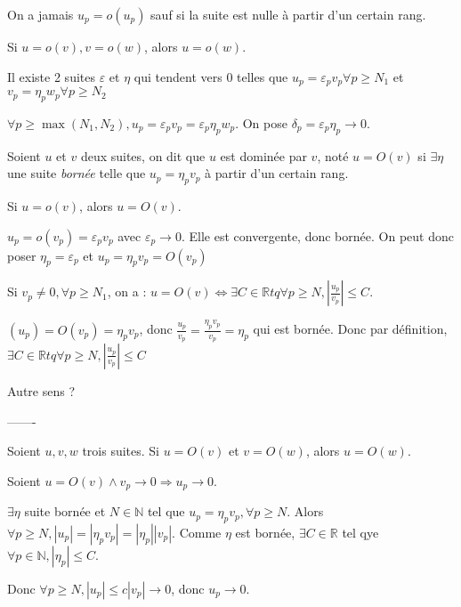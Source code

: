 \documentclass[french]{yLectureNote}
\newcommand{\N}[0]{\mathbb{N}}
\newcommand{\R}[0]{\mathbb{R}}
\begin{document}
On a jamais $u_p = o(u_p)$ sauf si la suite est nulle à partir d'un certain rang.
\begin{proposition}
Si $u = o(v), v=o(w)$, alors $u=o(w)$.
\end{proposition}
\begin{myproof}
Il existe 2 suites $\varepsilon$ et $\eta$ qui tendent vers 0 telles que $u_p = \varepsilon_pv_p \forall p\geq N_1$ et $v_p = \eta_pw_p \forall p\geq N_2$

$\forall p\geq \max(N_1,N_2), u_p = \varepsilon_pv_p = \varepsilon_p\eta_pw_p$. On pose $\delta_p = \varepsilon_p\eta_p \to 0$.
\end{myproof}
\begin{definition}
Soient $u$ et $v$ deux suites, on dit que $u$ est dominée par $v$, noté $u = O(v)$ si $\exists \eta $ une suite \emph{bornée} telle que $u_p = \eta_pv_p$ à partir d'un certain rang.
\end{definition}
\begin{proposition}
Si $u = o(v)$, alors $u=O(v)$.
\end{proposition}
\begin{myproof}[À faire]
$u_p = o(v_p) = \varepsilon_pv_p$ avec $\varepsilon_p\to 0$. Elle est convergente, donc bornée. On peut donc poser $\eta_p = \varepsilon_p$ et $u_p = \eta_pv_p = O(v_p)$
\end{myproof}
\begin{proposition}
Si $v_p \neq 0, \forall p\geq N_1$, on a :
$u = O(v)  \iff \exists C \in\R tq \forall p\geq N, |\frac{u_p}{v_p}| \leq C$.
\end{proposition}
\begin{myproof}
$(u_p) = O(v_p) = \eta_pv_p$, donc $\frac{u_p}{v_p} = \frac{\eta_pv_p}{v_p} = \eta_p$ qui est bornée. Donc par définition, $\exists C \in\R tq \forall p\geq N, |\frac{u_p}{v_p}| \leq C$

Autre sens ?
\end{myproof}
-------
\begin{proposition}
Soient $u,v,w$ trois suites. Si $u=O(v)$ et $v=O(w)$, alors $u=O(w)$.
\end{proposition}
\begin{proposition}
Soient $u = O(v) \wedge v_p\to 0 \Rightarrow u_p\to 0$.
\end{proposition}
\begin{myproof}
$\exists \eta$ suite bornée et $N\in\N$ tel que $u_p =\eta_pv_p,\forall p\geq N$. Alors $\forall p\geq N, |u_p| = |\eta_pv_p| = |\eta_p||v_p|$. Comme $\eta$ est bornée, $\exists C\in\R$ tel qye $\forall p\in\N, |\eta_p|\leq C$.

Donc $ \forall p\geq N, |u_p|\leq c|v_p| \to 0$, donc $u_p\to 0$.
\end{myproof}
\end{document}
